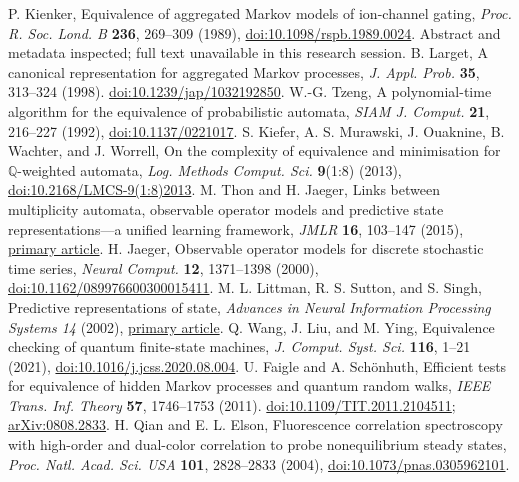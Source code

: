  P. Kienker, Equivalence of aggregated Markov models of ion-channel gating, \emph{Proc. R. Soc. Lond. B} \textbf{236}, 269--309 (1989), \href{https://doi.org/10.1098/rspb.1989.0024}{doi:10.1098/rspb.1989.0024}. Abstract and metadata inspected; full text unavailable in this research session.
 B. Larget, A canonical representation for aggregated Markov processes, \emph{J. Appl. Prob.} \textbf{35}, 313--324 (1998). \href{https://doi.org/10.1239/jap/1032192850}{doi:10.1239/jap/1032192850}.
 W.-G. Tzeng, A polynomial-time algorithm for the equivalence of probabilistic automata, \emph{SIAM J. Comput.} \textbf{21}, 216--227 (1992), \href{https://doi.org/10.1137/0221017}{doi:10.1137/0221017}.
 S. Kiefer, A. S. Murawski, J. Ouaknine, B. Wachter, and J. Worrell, On the complexity of equivalence and minimisation for $\mathbb Q$-weighted automata, \emph{Log. Methods Comput. Sci.} \textbf{9}(1:8) (2013), \href{https://doi.org/10.2168/LMCS-9(1:8)2013}{doi:10.2168/LMCS-9(1:8)2013}.
 M. Thon and H. Jaeger, Links between multiplicity automata, observable operator models and predictive state representations---a unified learning framework, \emph{JMLR} \textbf{16}, 103--147 (2015), \href{https://jmlr.org/papers/v16/thon15a.html}{primary article}.
 H. Jaeger, Observable operator models for discrete stochastic time series, \emph{Neural Comput.} \textbf{12}, 1371--1398 (2000), \href{https://doi.org/10.1162/089976600300015411}{doi:10.1162/089976600300015411}.
 M. L. Littman, R. S. Sutton, and S. Singh, Predictive representations of state, \emph{Advances in Neural Information Processing Systems 14} (2002), \href{https://papers.neurips.cc/paper/1983-predictive-representations-of-state.pdf}{primary article}.
 Q. Wang, J. Liu, and M. Ying, Equivalence checking of quantum finite-state machines, \emph{J. Comput. Syst. Sci.} \textbf{116}, 1--21 (2021), \href{https://doi.org/10.1016/j.jcss.2020.08.004}{doi:10.1016/j.jcss.2020.08.004}.
 U. Faigle and A. Sch\"onhuth, Efficient tests for equivalence of hidden Markov processes and quantum random walks, \emph{IEEE Trans. Inf. Theory} \textbf{57}, 1746--1753 (2011). \href{https://doi.org/10.1109/TIT.2011.2104511}{doi:10.1109/TIT.2011.2104511}; \href{https://arxiv.org/abs/0808.2833}{arXiv:0808.2833}.
 H. Qian and E. L. Elson, Fluorescence correlation spectroscopy with high-order and dual-color correlation to probe nonequilibrium steady states, \emph{Proc. Natl. Acad. Sci. USA} \textbf{101}, 2828--2833 (2004), \href{https://doi.org/10.1073/pnas.0305962101}{doi:10.1073/pnas.0305962101}.
